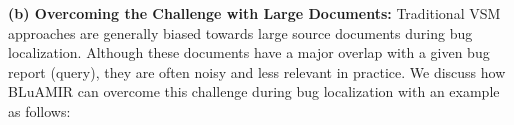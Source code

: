 \documentclass[conference]{IEEEtran}
\begin{document}



\textbf{(b) Overcoming the Challenge with Large Documents:}
Traditional VSM approaches are generally biased towards large source documents during bug localization. Although these documents have a major overlap with a given bug report (query), they are often noisy and less relevant in practice. We discuss how BLuAMIR can overcome this challenge during bug localization with an example as follows:
\end{document}
